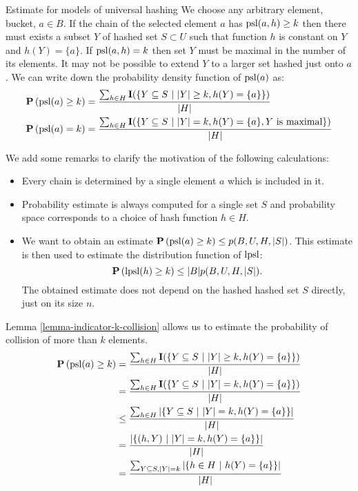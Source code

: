 \begin{section}{Estimate for models of universal hashing}
We choose any arbitrary element, bucket, $a \in B$. If the chain of the selected element $a$ has $\mathrm{psl}(a, h) \geq k$ then there must exists a subset $Y$ of hashed set $S \subset U$ such that function $h$ is constant on $Y$ and $h(Y) = \{ a \}$. If $\mathrm{psl}(a, h) = k$ then set $Y$ must be maximal in the number of its elements. It may not be possible to extend $Y$ to a larger set hashed just onto $a$. We can write down the probability density function of $\mathrm{psl}(a)$ as:
\begin{displaymath}
\begin{split}
\mathbf{P}\left(\mathrm{psl}(a) \geq k\right) & = \frac{\sum\displaylimits_{h \in H} \mathbf{I}(\{ Y \subseteq S \ | \  |Y| \geq k, h(Y) = \{ a \} \})}{|H|} \\
\mathbf{P}\left(\mathrm{psl}(a) = k\right) & = \frac{\sum\displaylimits_{h \in H} \mathbf{I}(\{ Y \subseteq S \ | \  |Y| = k, h(Y) = \{ a \}, Y \text{ is maximal} \})}{|H|} \\
\end{split}
\end{displaymath}

We add some remarks to clarify the motivation of the following calculations:
\begin{itemize}
\item Every chain is determined by a single element $a$ which is included in it.
\item Probability estimate is always computed for a single set $S$ and probability space corresponds to a choice of hash function $h \in H$.
\item We want to obtain an estimate $\mathbf{P}\left(\mathrm{psl}(a) \geq k\right) \leq p(B, U, H, |S|)$. This estimate is then used to estimate the distribution function of $\mathrm{lpsl}$: \[ \mathbf{P}\left(\mathrm{lpsl}(h) \geq k\right) \leq |B| p(B, U, H, |S|) \text{.} \] The obtained estimate does not depend on the hashed hashed set $S$ directly, just on its size $n$.
\end{itemize}

Lemma \ref{lemma-indicator-k-collision} allows us to estimate the probability of collision of more than $k$ elements.
\begin{displaymath}
\begin{split}
\mathbf{P}\left(\mathrm{psl}(a) \geq k\right)
	& = \frac{\sum\displaylimits_{h \in H} \mathbf{I}(\{ Y \subseteq S \ | \  |Y| \geq k, h(Y) = \{ a \} \})}{|H|} \\
	& = \frac{\sum\displaylimits_{h \in H} \mathbf{I}(\{ Y \subseteq S \ | \  |Y| = k, h(Y) = \{ a \} \})}{|H|} \\
	& \leq \frac{\sum\displaylimits_{h \in H} |\{ Y \subseteq S \ | \  |Y| = k, h(Y) = \{ a \} \}|}{|H|} \\
	& = \frac{|\{ (h, Y) \ | \  |Y| = k, h(Y) = \{ a \} \}|}{|H|} \\
	& = \frac{\sum\displaylimits_{Y \subseteq S, |Y| = k} | \{ h \in H \ | \  h(Y) = \{a\} \}|}{|H|} \\
\end{split}
\end{displaymath}


\end{section}
